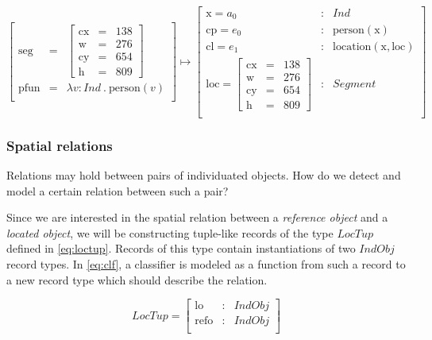 \documentclass[11pt, a4paper]{article}
\begin{document}
\begin{equation}\label{eq:indfunrec}
\left[\begin{array}{rcl}
\text{seg} &=& \left[\begin{array}{rcl}
\text{cx} &=& 138\\
\text{w} &=& 276\\
\text{cy} &=& 654\\
\text{h} &=& 809
\end{array}\right]\\
\text{pfun} &=& \lambda v:Ind\ .\ \text{person}(v)\\
\end{array}\right]
\mapsto
\left[\begin{array}{lcl}
    \text{x} = a_0 &:& Ind \\
    \text{cp} = e_0 &:& \text{person}(\text{x}) \\
    \text{cl} = e_1 &:& \text{location}(\text{x}, \text{loc}) \\
    \text{loc} = \left[\begin{array}{rcl}
\text{cx} &=& 138\\
\text{w} &=& 276\\
\text{cy} &=& 654\\
\text{h} &=& 809
\end{array}\right] &:& Segment\\
\end{array}\right]
\end{equation}



\subsubsection{Spatial relations}

Relations may hold between pairs of individuated objects.
How do we detect and model a certain relation between such a pair?

Since we are interested in the spatial relation between a \textit{reference object} and a \textit{located object}, we will be constructing tuple-like records of the type $LocTup$ defined in \autoref{eq:loctup}.
Records of this type contain instantiations of two $IndObj$ record types.
In \autoref{eq:clf}, a classifier is modeled as a function from such a record to a new record type which should describe the relation.

\begin{equation}\label{eq:loctup}
LocTup = \left[\begin{array}{rcl}
    \text{lo} &:& IndObj \\
    \text{refo} &:& IndObj \\
    \end{array}\right]
\end{equation}
\end{document}
